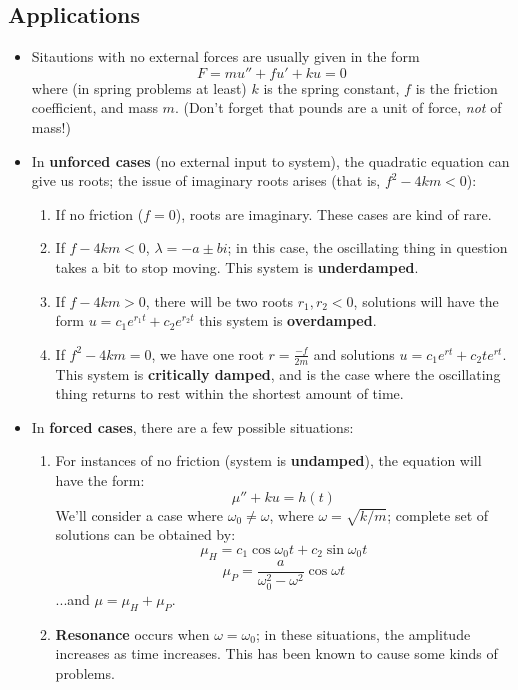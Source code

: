 \documentclass[10pt,letterpaper]{article}
\begin{document}
\subsection*{Applications} %
\begin{itemize}

\item Sitautions with no external forces are usually given in the form 
$$F = mu'' + fu' + ku = 0$$
where (in spring problems at least) $k$ is the spring constant, $f$ is the friction coefficient, and mass $m$. (Don't forget that pounds are a unit of force, \textit{not} of mass!)

\item In \textbf{unforced cases} (no external input to system), the quadratic equation can give us roots; the issue of imaginary roots arises (that is, $f^2-4km<0$): 
\begin{enumerate}
\item If no friction ($f=0$), roots are imaginary. These cases are kind of rare. 
\item If $f-4km<0$, $\lambda= -a\pm bi$; in this case, the oscillating thing in question takes a bit to stop moving. This system is \textbf{underdamped}.  
\item If $f-4km>0$, there will be two roots $r_1, r_2 < 0$, solutions will have the form $u=c_1e^{r_1t}+c_2e^{r_2t}$
this system is \textbf{overdamped}. 

\item If $f^2-4km=0$, we have one root $r=\frac{-f}{2m}$ and solutions $u=c_1e^{rt}+c_2te^{rt}$. This system is \textbf{critically damped}, and is the case where the oscillating thing returns to rest within the shortest amount of time. 

\end{enumerate}

\item In \textbf{forced cases}, there are a few possible situations: 
\begin{enumerate}
\item For instances of no friction (system is \textbf{undamped}), the equation will have the form: 
$$\mu'' + ku = h(t)$$
We'll consider a case where $\omega_0\neq \omega$, where $\omega = \sqrt{k/m}$; complete set of solutions can be obtained by: 
$$\mu_H = c_1\cos\omega_0 t + c_2\sin \omega_0 t$$
$$\mu_P = \frac{a}{\omega_0^2-\omega^2}\cos\omega t$$
...and $\mu = \mu_H+\mu_P$. 
\item \textbf{Resonance} occurs when $\omega = \omega_0$; in these situations, the amplitude increases as time increases. This has been known to cause some kinds of problems. 

\end{enumerate}


\end{itemize}
\end{document}
